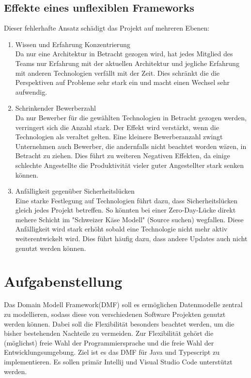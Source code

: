 \documentclass[./einleitung.tex]{subfiles}
\begin{document}
\subsection{Effekte eines unflexiblen Frameworks}
Dieser fehlerhafte Ansatz schädigt das Projekt auf mehreren Ebenen:
\begin{enumerate}
\item Wissen und Erfahrung Konzentrierung \\
Da nur eine Architektur in Betracht gezogen wird, hat jedes Mitglied des Teams nur Erfahrung mit der aktuellen Architektur und jegliche Erfahrung mit anderen Technologien verfällt mit der Zeit. Dies schränkt die die Perspektiven auf Probleme sehr stark ein und macht einen Wechsel sehr aufwendig.
\item Schrinkender Bewerberzahl \\
Da nur Bewerber für die gewählten Technologien in Betracht gezogen werden, verringert sich die Anzahl stark. Der Effekt wird verstärkt, wenn die Technologien als veraltet gelten. Eine kleinere Bewerberanzahl zwingt Unternehmen auch Bewerber, die andernfalls nicht beachtet worden wären, in Betracht zu ziehen. Dies führt zu weiteren Negativen Effekten, da einige schlechte Angestellte die Produktivität vieler guter Angestellter stark senken können.
\item Anfälligkeit gegenüber Sicherheitslücken \\
Eine starke Festlegung auf Technologien führt dazu, dass Sicherheitslücken gleich jedes Projekt betreffen. So könnten bei einer Zero-Day-Lücke direkt mehere Schicht im "Schweizer Käse Modell" (Source suchen)  wegfallen.
Diese Anfälligkeit wird stark erhöht sobald eine Technologie nicht mehr aktiv weiterentwickelt wird. Dies führt häufig dazu, dass andere Updates auch nicht genutzt werden können.
\end{enumerate}

\section{Aufgabenstellung}
Das Domain Modell Framework(DMF) soll es ermöglichen Datenmodelle zentral zu modellieren, sodass diese von verschiedenen Software Projekten genutzt werden können. Dabei soll die Flexibilität besonders beachtet werden, um die bisher bestehenden Nachteile zu vermeiden. Zur Flexibilität gehört die (möglichst) freie Wahl der Programmiersprache und die freie Wahl der Entwicklungsumgebung.
\newline
Ziel ist es das DMF für Java und Typescript zu implementieren. 
Es sollen primär Intellij und Visual Studio Code unterstützt werden. 
\end{document}
